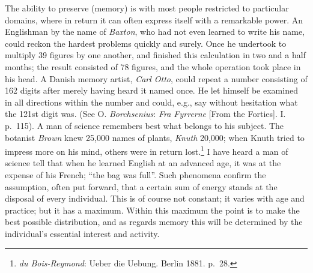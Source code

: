 \documentclass[12pt,a4paper]{book}
\newcommand{\opage}[1]{\marginnote{\footnotesize\textit{[#1]}}}
\begin{document}
The ability to preserve (memory) is with most people restricted to
particular domains, where in return it can often express itself with a
remarkable power. An Englishman by the name of \emph{Baxton}, who had not
even learned to write his name, could reckon the hardest problems quickly
and surely. Once he undertook to multiply 39 figures by one another, and
finished this calculation in two and a half months; the result consisted
of 78 figures, and the whole operation took place in his head. A Danish
memory artist, \emph{Carl Otto}, could repeat a number consisting of 162
digits after merely having heard it named once. He let himself be examined
in all directions within the number and could, e.g., say without
hesitation what the 121st digit was. (See O. \emph{Borchsenius}:
\emph{Fra Fyrrerne} [From the Forties]. I. p.~115). A man of science
remembers best what belongs to his subject. The botanist \emph{Brown} knew
25,000 names of plants, \emph{Knuth} 20,000; when Knuth tried to impress
more on his mind, others were in return
lost.\footnote{\emph{du Bois-Reymond}: Ueber die Uebung. Berlin 1881.
p.~28.} I have heard a man of science tell that when he learned English at
an advanced age, it was at the expense of his French; ``the bag was full''.
\opage{185}Such phenomena confirm the assumption, often put forward, that
a certain sum of energy stands at the disposal of every individual. This
is of course not constant; it varies with age and practice; but it has a
maximum. Within this maximum the point is to make the best possible
distribution, and as regards memory this will be determined by the
individual's essential interest and activity.
\end{document}
